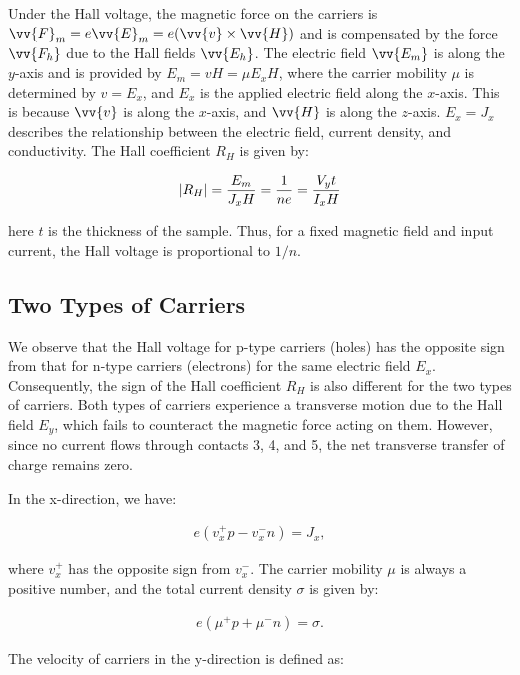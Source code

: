 Under the Hall voltage, the magnetic force on the carriers is $\vv{F}_m=e\vv{E}_m=e(\vv{v}\times\vv{H})$ and is compensated by the force $\vv{F_h}$ due to the Hall fields $\vv{E_h}$. The electric field $\vv{E_m}$ is along the $y$-axis and is provided by $E_m = vH = \mu E_x H$, where the carrier mobility $\mu$ is determined by $v = E_x$, and $E_x$ is the applied electric field along the $x$-axis. This is because $\vv{v}$ is along the $x$-axis, and $\vv{H}$ is along the $z$-axis. $E_x = J_x$ describes the relationship between the electric field, current density, and conductivity. The Hall coefficient $R_H$ is given by:

\begin{align}
    \label{eq:1}
    \abs{R_H}=\frac{E_m}{J_xH}=\frac{1}{ne}=\frac{V_y t}{I_xH}
\end{align}

here $t$ is the thickness of the sample. Thus, for a fixed magnetic field and input current, the Hall voltage is proportional to $1/n$.

\subsection{Two Types of Carriers}
We observe that the Hall voltage for p-type carriers (holes) has the opposite sign from that for n-type carriers (electrons) for the same electric field $E_x$. Consequently, the sign of the Hall coefficient $R_H$ is also different for the two types of carriers. Both types of carriers experience a transverse motion due to the Hall field $E_y$, which fails to counteract the magnetic force acting on them. However, since no current flows through contacts 3, 4, and 5, the net transverse transfer of charge remains zero.

In the x-direction, we have:

\begin{align}
    e(v^+_xp-v^-_xn)=J_x,
    \label{eq:x_direction}
\end{align}

where $v^+_x$ has the opposite sign from $v^-_x$. The carrier mobility $\mu$ is always a positive number, and the total current density $\sigma$ is given by:

\begin{align}
    e(\mu^+p+\mu^-n)=\sigma.
    \label{eq:total_current_density}
\end{align}

The velocity of carriers in the y-direction is defined as:

